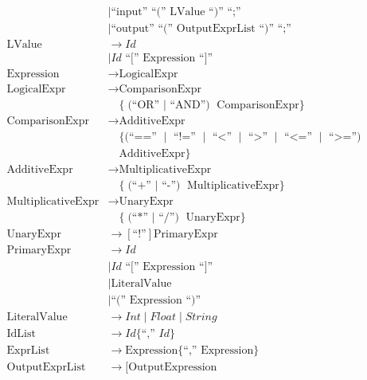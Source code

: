 \documentclass[12pt,a4paper]{article}
\begin{document}
\begin{align*}
                   &\mid \text{``input'' ``('' } \text{LValue} \text{ ``)'' ``;''} \\
                   &\mid \text{``output'' ``('' } \text{OutputExprList} \text{ ``)'' ``;''} \\
    \text{LValue} &\rightarrow \mathit{Id} \\
                 &\mid \mathit{Id} \text{ ``['' } \text{Expression} \text{ ``]''} \\
    \text{Expression} &\rightarrow \text{LogicalExpr} \\
    \text{LogicalExpr} &\rightarrow \text{ComparisonExpr} \\
                      &\quad \{ \text{(``OR'' $\mid$ ``AND'') } \text{ComparisonExpr} \} \\
    \text{ComparisonExpr} &\rightarrow \text{AdditiveExpr} \\
                         &\quad \{ \text{(``=='' $\mid$ ``!='' $\mid$ ``<'' $\mid$ ``>'' $\mid$ ``<='' $\mid$ ``>='')} \\
                         &\quad \text{AdditiveExpr} \} \\
    \text{AdditiveExpr} &\rightarrow \text{MultiplicativeExpr} \\
                       &\quad \{ \text{(``+'' $\mid$ ``-'') } \text{MultiplicativeExpr} \} \\
    \text{MultiplicativeExpr} &\rightarrow \text{UnaryExpr} \\
                             &\quad \{ \text{(``*'' $\mid$ ``/'') } \text{UnaryExpr} \} \\
    \text{UnaryExpr} &\rightarrow [\text{``!''}] \text{PrimaryExpr} \\
    \text{PrimaryExpr} &\rightarrow \mathit{Id} \\
                     &\mid \mathit{Id} \text{ ``['' } \text{Expression} \text{ ``]''} \\
                     &\mid \text{LiteralValue} \\
                     &\mid \text{``('' } \text{Expression} \text{ ``)''} \\
    \text{LiteralValue} &\rightarrow \mathit{Int} \mid \mathit{Float} \mid \mathit{String} \\
    \text{IdList} &\rightarrow \mathit{Id} \{ \text{``,'' } \mathit{Id} \} \\
    \text{ExprList} &\rightarrow \text{Expression} \{ \text{``,'' } \text{Expression} \} \\
    \text{OutputExprList} &\rightarrow [ \text{OutputExpression} \\

\end{align*}
\end{document}
